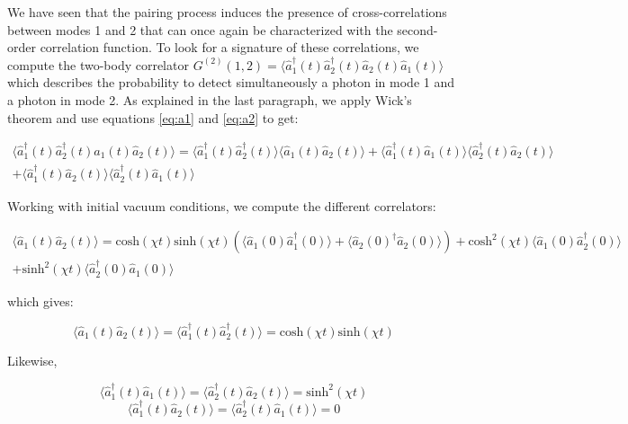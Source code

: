 We have seen that the pairing process induces the presence of cross-correlations between modes 1 and 2 that can once again be characterized with the second-order correlation function. To look for a signature of these correlations, we compute the two-body correlator $G^{(2)}(1,2) =\langle \hat{a}_1^{\dagger}(t) \hat{a}_2^{\dagger}(t) \hat{a}_2(t) \hat{a}_1(t) \rangle$ which describes the probability to detect simultaneously a photon in mode 1 and a photon in mode 2. As explained in the last paragraph, we apply Wick's theorem and use equations \ref{eq:a1} and \ref{eq:a2} to get:

\begin{equation}
\begin{split}
    \langle \hat{a}_1^{\dagger}(t) \hat{a}_2^{\dagger}(t) \hat{a}_1(t) \hat{a}_2(t) \rangle = \langle \hat{a}_1^{\dagger}(t) \hat{a}_2^{\dagger}(t) \rangle \langle \hat{a}_1(t) \hat{a}_2(t) \rangle +  \langle \hat{a}_1^{\dagger}(t) \hat{a}_1(t) \rangle \langle \hat{a}_2^{\dagger}(t) \hat{a}_2(t) \rangle \\
    +  \langle \hat{a}_1^{\dagger}(t) \hat{a}_2(t) \rangle \langle \hat{a}_2^{\dagger}(t) \hat{a}_1(t) \rangle
\end{split}
\label{eq:wick_NDPA}
\end{equation}

\noindent Working with initial vacuum conditions, we compute the different correlators:

\begin{equation}
\begin{split}
   \langle \hat{a}_1(t) \hat{a}_2(t) \rangle = \mathrm{cosh} (\chi t) \mathrm{sinh} (\chi t) (\langle \hat{a}_1(0) \hat{a}_1^{\dagger}(0) \rangle+ \langle \hat{a}_2(0)^{\dagger} \hat{a}_2(0) \rangle) + \mathrm{cosh}^2 (\chi t) \langle \hat{a}_1(0) \hat{a}_2^{\dagger}(0) \rangle \\
   + \mathrm{sinh}^2 (\chi t) \langle \hat{a}_2^{\dagger}(0) \hat{a}_1(0) \rangle 
\end{split}
\end{equation}

\noindent which gives:

\begin{equation}
    \langle \hat{a}_1(t) \hat{a}_2(t) \rangle = \langle \hat{a}_1^{\dagger}(t) \hat{a}_2^{\dagger}(t) \rangle = \mathrm{cosh} (\chi t) \mathrm{sinh} (\chi t)
\end{equation}

\noindent Likewise,

\begin{equation}
     \langle \hat{a}_1^{\dagger}(t) \hat{a}_1(t) \rangle = \langle \hat{a}_2^{\dagger}(t) \hat{a}_2(t) \rangle = \mathrm{sinh}^2 (\chi t)
\end{equation}
\begin{equation}
    \langle \hat{a}_1^{\dagger}(t) \hat{a}_2(t) \rangle =  \langle \hat{a}_2^{\dagger}(t) \hat{a}_1(t) \rangle = 0
\end{equation}

